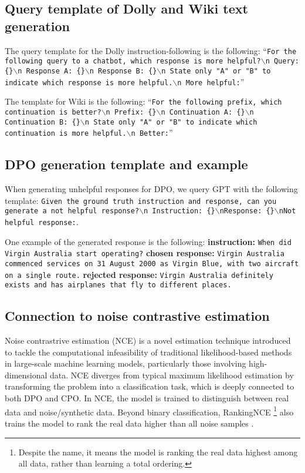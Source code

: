 \subsection{Query template of Dolly and Wiki text generation}
The query template for the Dolly instruction-following is the following: ``\texttt{For the following query to a chatbot, which response is more helpful?$\backslash$n
    Query: \{\}$\backslash$n
    Response A: \{\}$\backslash$n
    Response B: \{\}$\backslash$n
    State only "A" or "B" to indicate which response is more helpful.$\backslash$n
    More helpful:}''
    
The template for Wiki is the following: ``\texttt{For the following prefix, which continuation is better?$\backslash$n
    Prefix: \{\}$\backslash$n
    Continuation A: \{\}$\backslash$n
    Continuation B: \{\}$\backslash$n
    State only "A" or "B" to indicate which continuation is more helpful.$\backslash$n
    Better:}''
    
\subsection{DPO generation template and example}

When generating unhelpful responses for DPO, we query GPT with the following template:
\texttt{Given the ground truth instruction and response, can you generate a not helpful response?$\backslash$n Instruction: \{\}$\backslash$nResponse: \{\}$\backslash$nNot helpful response:}. 

One example of the generated response is the following:
\textbf{instruction:} \texttt{When did Virgin Australia start operating?}
\textbf{chosen response:} \texttt{Virgin Australia commenced services on 31 August 2000 as Virgin Blue, with two aircraft on a single route.}
\textbf{rejected response:} \texttt{Virgin Australia definitely exists and has airplanes that fly to different places.}


\subsection{Connection to noise contrastive estimation}
Noise contrastrive estimation (NCE) \citep{gutmann2010noise} is a novel estimation technique introduced to tackle the computational infeasibility of traditional likelihood-based methods in large-scale machine learning models, particularly those involving high-dimensional data. NCE diverges from typical maximum likelihood estimation by transforming the problem into a classification task, which is deeply connected to both DPO and CPO. In NCE, the model is trained to distinguish between real data and noise/synthetic data. Beyond binary classification, RankingNCE \footnote{Despite the name, it means the model is ranking the real data highest among all data, rather than learning a total ordering.} also trains the model to rank the real data higher than all noise samples \citep{ma2018noise}. 

